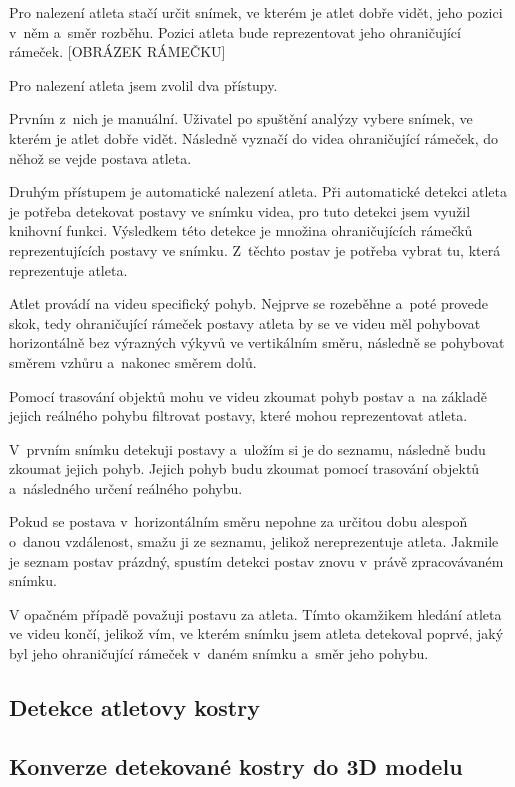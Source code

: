 Pro nalezení atleta stačí určit snímek, ve kterém je atlet dobře vidět, jeho pozici v~něm a~směr rozběhu. Pozici atleta bude reprezentovat jeho ohraničující rámeček. [OBRÁZEK RÁMEČKU]

Pro nalezení atleta jsem zvolil dva přístupy.

Prvním z~nich je manuální. Uživatel po spuštění analýzy vybere snímek, ve kterém je atlet dobře vidět. Následně vyznačí do videa ohraničující rámeček, do něhož se vejde postava atleta.

Druhým přístupem je automatické nalezení atleta. Při automatické detekci atleta je potřeba detekovat postavy ve snímku videa, pro tuto detekci jsem využil knihovní funkci. Výsledkem této detekce je množina ohraničujících rámečků reprezentujících postavy ve snímku. Z~těchto postav je potřeba vybrat tu, která reprezentuje atleta.

Atlet provádí na videu specifický pohyb. Nejprve se rozeběhne a~poté provede skok, tedy ohraničující rámeček postavy atleta by se ve videu měl pohybovat horizontálně bez výrazných výkyvů ve vertikálním směru, následně se pohybovat směrem vzhůru a~nakonec směrem dolů.

Pomocí trasování objektů mohu ve videu zkoumat pohyb postav a~na základě jejich reálného pohybu filtrovat postavy, které mohou reprezentovat atleta.

V~prvním snímku detekuji postavy a~uložím si je do seznamu, následně budu zkoumat jejich pohyb. Jejich pohyb budu zkoumat pomocí trasování objektů a~následného určení reálného pohybu.

Pokud se postava v~horizontálním směru nepohne za určitou dobu alespoň o~danou vzdálenost, smažu ji ze seznamu, jelikož nereprezentuje atleta. Jakmile je seznam postav prázdný, spustím detekci postav znovu v~právě zpracovávaném snímku.

V opačném případě považuji postavu za atleta. Tímto okamžikem hledání atleta ve videu končí, jelikož vím, ve kterém snímku jsem atleta detekoval poprvé, jaký byl jeho ohraničující rámeček v~daném snímku a~směr jeho pohybu.

\subsection{Detekce atletovy kostry}


\subsection{Konverze detekované kostry do 3D modelu}


